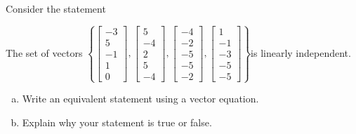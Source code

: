 
\begin{exerciseStatement}


Consider the statement 
\begin{center}\begin{minipage}{0.8\textwidth}
 The set of vectors \( \left\{ \left[\begin{array}{c}
-3 \\
5 \\
-1 \\
1 \\
0
\end{array}\right] , \left[\begin{array}{c}
5 \\
-4 \\
2 \\
5 \\
-4
\end{array}\right] , \left[\begin{array}{c}
-4 \\
-2 \\
-5 \\
-5 \\
-2
\end{array}\right] , \left[\begin{array}{c}
1 \\
-1 \\
-3 \\
-5 \\
-5
\end{array}\right] \right\} \)is linearly independent.
\end{minipage}\end{center}
    


\begin{enumerate}[(a)]
\item  Write an equivalent statement using a vector equation.
\item  Explain why your statement is true or false.
\end{enumerate}
    
\end{exerciseStatement}
    
